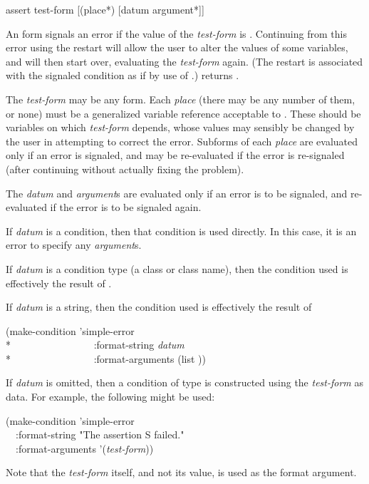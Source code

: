 \begin{defmac}
assert test-form [({place}*) [datum {argument}*]]

An  form signals an error if the value of the \emph{test-form} is
.  Continuing from this error using the  restart will
allow the user to alter the values of some variables, and  will then
start over, evaluating the \emph{test-form} again.  (The restart is associated
with the signaled condition as if by use of .)
 returns .

The \emph{test-form} may be any form. Each \emph{place} (there may be any number
of them, or none) must be a generalized variable reference acceptable to
.  These should be variables on which \emph{test-form} depends, whose
values may sensibly be changed by the user in attempting to correct the error.
Subforms of each \emph{place} are evaluated only if an error is signaled, and
may be re-evaluated if the error is re-signaled (after continuing without
actually fixing the problem).

The \emph{datum} and \emph{argument\/}s are evaluated only if an error is to be
signaled, and re-evaluated if the error is to be signaled again.

If \emph{datum} is a condition, then that condition is used directly.  In this
case, it is an error to specify any \emph{argument\/}s.

If \emph{datum} is a condition type (a class or class name), then the condition
used is effectively the result of .

If \emph{datum} is a string, then the condition used is effectively the result
of
\begin{lisp}
(make-condition 'simple-error \\*
~~~~~~~~~~~~~~~~:format-string \emph{datum} \\*
~~~~~~~~~~~~~~~~:format-arguments (list ))
\end{lisp}

If \emph{datum} is omitted, then a condition of type  is
constructed using the \emph{test-form} as data. For example, the following might
be used:
\begin{lisp}
(make-condition 'simple-error \\
~~:format-string "The assertion {\Xtilde}S failed." \\
~~:format-arguments '(\emph{test-form}))
\end{lisp}
Note that the \emph{test-form} itself, and not its value, is used as the format
argument.


\end{defmac}
